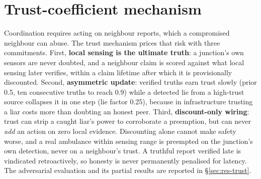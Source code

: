 \section{Trust-coefficient mechanism}\label{sec:des-trust}
Coordination requires acting on neighbour reports, which a compromised
neighbour can abuse. The trust mechanism prices that risk with three
commitments. First, \textbf{local sensing is the ultimate truth}: a
junction's own sensors are never doubted, and a neighbour claim is scored
against what local sensing later verifies, within a claim lifetime after
which it is provisionally discounted. Second,
\textbf{asymmetric update}: verified truths earn trust slowly (prior 0.5,
ten consecutive truths to reach 0.9) while a detected lie from a high-trust
source collapses it in one step (lie factor 0.25), because in
infrastructure trusting a liar costs more than doubting an honest peer. Third, \textbf{discount-only wiring}: trust can strip a caught
liar's power to corroborate a preemption, but can never \emph{add} an
action on zero local evidence. Discounting alone cannot make safety
worse, and a real ambulance within sensing range is preempted on the
junction's own detection, never on a neighbour's trust. A
truthful report verified late is vindicated retroactively, so honesty is
never permanently penalised for latency. The adversarial evaluation and
its partial results are reported in \S\ref{sec:res-trust}.


